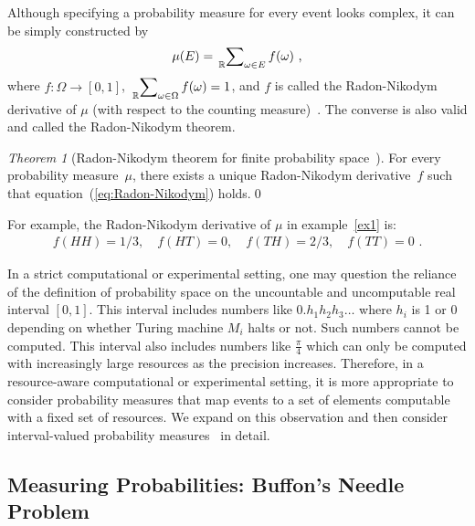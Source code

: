 \documentclass{article}
\theoremstyle{remark}
\newtheorem{thm}{Theorem}
\newcommand{\pmeas}{\ensuremath{\mu}}
\newcommand{\yutsung}[1]{\fbox{\begin{minipage}{0.9\textwidth}\color{purple}{Yu-Tsung says: #1}\end{minipage}}}
\begin{document}
Although specifying a probability measure for every event looks complex,
it can be simply constructed by 
\begin{equation}
\pmeas(E)=\sideset{_{\mathbb{R}}}{_{\omega\in E}}\sum f(\omega)\textrm{ ,}\label{eq:Radon-Nikodym}
\end{equation}
where $f:\Omega\rightarrow[0,1]$, $\sideset{_{\mathbb{R}}}{_{\omega\in\Omega}}\sum f(\omega)=1$,
and $f$ is called the Radon-Nikodym derivative of $\pmeas$ (with
respect to the counting measure)~\cite{Nikodym1930,Folland2013}.
The converse is also valid and called the Radon-Nikodym theorem.

\begin{thm}[Radon-Nikodym theorem for finite probability space~\cite{Kolmogorov1950,Swart2013}]
For every probability measure~$\pmeas$, there exists a unique Radon-Nikodym
derivative~$f$ such that equation~(\ref{eq:Radon-Nikodym}) holds.\qed\end{thm}

For example, the Radon-Nikodym derivative of $\pmeas$ in example~\ref{ex1}
is: 
\[
\begin{array}{rcl}
f\left(HH\right)=1/3,\quad f\left(HT\right)=0,\quad f\left(TH\right)=2/3,\quad f\left(TT\right)=0\textrm{ .}\end{array}
\]

In a strict computational or experimental setting, one may question
the reliance of the definition of probability space on the uncountable
and uncomputable real interval $[0,1]$. This interval includes numbers
like $0.h_{1}h_{2}h_{3}\ldots$ where $h_{i}$ is 1 or 0 depending
on whether Turing machine $M_{i}$ halts or not. Such numbers cannot
be computed. This interval also includes numbers like $\frac{\pi}{4}$
which can only be computed with increasingly large resources as the
precision increases. %
Therefore, in a resource-aware computational or experimental setting,
it is more appropriate to consider probability measures that map events
to a set of elements computable with a fixed set of resources. We
expand on this observation and then consider %
interval-valued probability measures~\cite{Weichselberger2000,JamisonLodwick2004}
in detail.

\subsection{Measuring Probabilities: Buffon's Needle
Problem\label{subsec:Measuring-Probabilities:-Buffon}}
 
\end{document}
